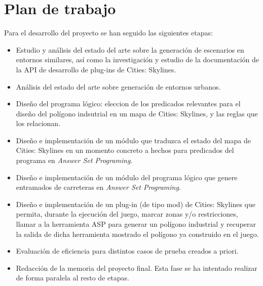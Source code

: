 \section{Plan de trabajo}

Para el desarrollo del proyecto se han seguido las siguientes etapas:

\begin{itemize}
	\item Estudio y análisis del estado del arte sobre la generación de escenarios en entornos similares, así como la investigación y estudio de la documentación de la API de desarrollo de plug-ins de Cities: Skylines\textcopyright. 
	\item Análisis del estado del arte sobre generación de entornos urbanos.
	\item Diseño del programa lógico: eleccion de los predicados relevantes para el diseño del polígono indsutrial en un mapa de Cities: Skylines\textcopyright, y las reglas que los relacionan.
	\item Diseño e implementación de un módulo que traduzca el estado del mapa de Cities: Skylines en un momento concreto a hechos para predicados del programa en \textit{Answer Set Programing}.
	\item Diseño e implementación de un módulo del programa lógico que genere entramados de carreteras en \textit{Answer Set Programing}.
	\item Diseño e implementación de un plug-in (de tipo mod) de Cities: Skylines\textcopyright\xspace que permita, durante la ejecución del juego, marcar zonas y/o restricciones, llamar a la herramienta ASP para generar un polígono industrial y recuperar la salida de dicha herramienta mostrado el polígono ya construido en el juego.
	\item Evaluación de eficiencia para distintos casos de prueba creados a priori.
	\item Redacción de la memoria del proyecto final. Esta fase se ha intentado realizar de forma paralela al resto de etapas.
\end{itemize}